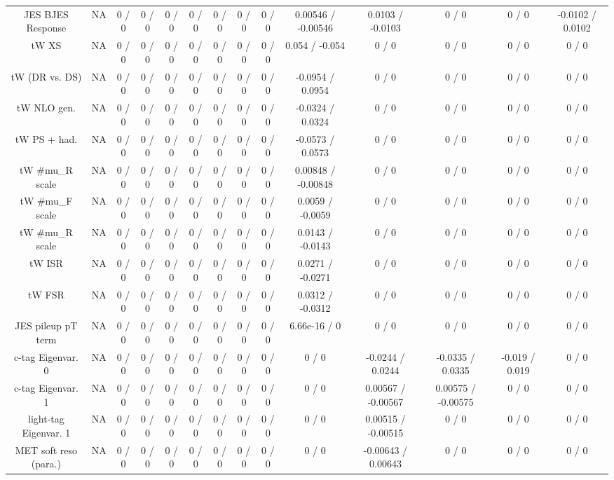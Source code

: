 \documentclass[10pt]{article}
\begin{document}
\begin{table}[htbp]
\begin{center}
\begin{tabular}{|c|c|c|c|c|c|c|c|c|c|c|c|c|c|}
  JES BJES Response &    NA    & 0 / 0 & 0 / 0 & 0 / 0 & 0 / 0 & 0 / 0 & 0 / 0 & 0 / 0 & 0.00546 / -0.00546 & 0.0103 / -0.0103 & 0 / 0 & 0 / 0 & -0.0102 / 0.0102 \\ 
  tW XS &    NA    & 0 / 0 & 0 / 0 & 0 / 0 & 0 / 0 & 0 / 0 & 0 / 0 & 0 / 0 & 0.054 / -0.054 & 0 / 0 & 0 / 0 & 0 / 0 & 0 / 0 \\ 
  tW (DR vs. DS) &    NA    & 0 / 0 & 0 / 0 & 0 / 0 & 0 / 0 & 0 / 0 & 0 / 0 & 0 / 0 & -0.0954 / 0.0954 & 0 / 0 & 0 / 0 & 0 / 0 & 0 / 0 \\ 
  tW NLO gen. &    NA    & 0 / 0 & 0 / 0 & 0 / 0 & 0 / 0 & 0 / 0 & 0 / 0 & 0 / 0 & -0.0324 / 0.0324 & 0 / 0 & 0 / 0 & 0 / 0 & 0 / 0 \\ 
  tW PS + had. &    NA    & 0 / 0 & 0 / 0 & 0 / 0 & 0 / 0 & 0 / 0 & 0 / 0 & 0 / 0 & -0.0573 / 0.0573 & 0 / 0 & 0 / 0 & 0 / 0 & 0 / 0 \\ 
  tW #mu_{R} scale &    NA    & 0 / 0 & 0 / 0 & 0 / 0 & 0 / 0 & 0 / 0 & 0 / 0 & 0 / 0 & 0.00848 / -0.00848 & 0 / 0 & 0 / 0 & 0 / 0 & 0 / 0 \\ 
  tW #mu_{F} scale &    NA    & 0 / 0 & 0 / 0 & 0 / 0 & 0 / 0 & 0 / 0 & 0 / 0 & 0 / 0 & 0.0059 / -0.0059 & 0 / 0 & 0 / 0 & 0 / 0 & 0 / 0 \\ 
  tW #mu_{R} scale &    NA    & 0 / 0 & 0 / 0 & 0 / 0 & 0 / 0 & 0 / 0 & 0 / 0 & 0 / 0 & 0.0143 / -0.0143 & 0 / 0 & 0 / 0 & 0 / 0 & 0 / 0 \\ 
  tW ISR &    NA    & 0 / 0 & 0 / 0 & 0 / 0 & 0 / 0 & 0 / 0 & 0 / 0 & 0 / 0 & 0.0271 / -0.0271 & 0 / 0 & 0 / 0 & 0 / 0 & 0 / 0 \\ 
  tW FSR &    NA    & 0 / 0 & 0 / 0 & 0 / 0 & 0 / 0 & 0 / 0 & 0 / 0 & 0 / 0 & 0.0312 / -0.0312 & 0 / 0 & 0 / 0 & 0 / 0 & 0 / 0 \\ 
  JES pileup pT term &    NA    & 0 / 0 & 0 / 0 & 0 / 0 & 0 / 0 & 0 / 0 & 0 / 0 & 0 / 0 & 6.66e-16 / 0 & 0 / 0 & 0 / 0 & 0 / 0 & 0 / 0 \\ 
  c-tag Eigenvar. 0 &    NA    & 0 / 0 & 0 / 0 & 0 / 0 & 0 / 0 & 0 / 0 & 0 / 0 & 0 / 0 & 0 / 0 & -0.0244 / 0.0244 & -0.0335 / 0.0335 & -0.019 / 0.019 & 0 / 0 \\ 
  c-tag Eigenvar. 1 &    NA    & 0 / 0 & 0 / 0 & 0 / 0 & 0 / 0 & 0 / 0 & 0 / 0 & 0 / 0 & 0 / 0 & 0.00567 / -0.00567 & 0.00575 / -0.00575 & 0 / 0 & 0 / 0 \\ 
  light-tag Eigenvar. 1 &    NA    & 0 / 0 & 0 / 0 & 0 / 0 & 0 / 0 & 0 / 0 & 0 / 0 & 0 / 0 & 0 / 0 & 0.00515 / -0.00515 & 0 / 0 & 0 / 0 & 0 / 0 \\ 
  MET soft reso (para.) &    NA    & 0 / 0 & 0 / 0 & 0 / 0 & 0 / 0 & 0 / 0 & 0 / 0 & 0 / 0 & 0 / 0 & -0.00643 / 0.00643 & 0 / 0 & 0 / 0 & 0 / 0 \\ 

\end{tabular}
\end{center}
\end{table}
\end{document}
